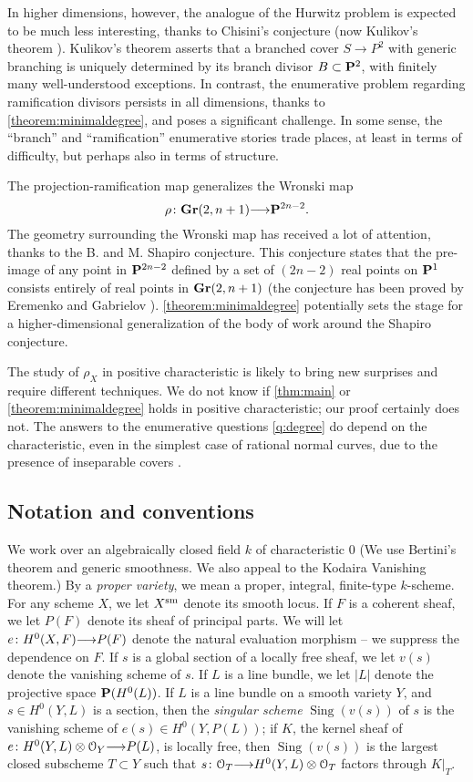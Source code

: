 \documentclass[11pt,reqno]{amsart}
\theoremstyle{plain}
\theoremstyle{definition}
\theoremstyle{remark}
\numberwithin{equation}{section}
\DeclareMathOperator{\sing}{Sing}
\newcommand{\cO}{{\mathcal O}}
\renewcommand{\to}{{\longrightarrow}}
\numberwithin{equation}{section}
\begin{document}
In higher dimensions, however, the analogue of the Hurwitz problem is expected to be much less interesting, thanks to Chisini's conjecture (now Kulikov's theorem \cite{1064-5632-63-6-A03}).
Kulikov's theorem asserts that a branched cover $S \to P^2$ with generic branching is uniquely determined by its branch divisor $B \subset \P^{2}$, with finitely many well-understood exceptions.
In contrast, the enumerative problem regarding ramification divisors persists in all dimensions, thanks to \autoref{theorem:minimaldegree}, and poses a significant challenge.
In some sense, the ``branch'' and ``ramification'' enumerative stories trade places, at least in terms of difficulty, but perhaps also in terms of structure.

The projection-ramification map generalizes the Wronski map
\[ \rho \from \Gr(2, n+1) \to \P^{2n-2}.\]
The geometry surrounding the Wronski map has received a lot of attention, thanks to the B. and M. Shapiro conjecture.
This conjecture states that the pre-image of any point in $\P^{2n-2}$ defined by a set of $(2n-2)$ real points on $\P^1$ consists entirely of real points in $\Gr(2, n+1)$ \cite{sottile2000} (the conjecture has been proved by Eremenko and Gabrielov \cite{Erem/Gabr1}).
\autoref{theorem:minimaldegree} potentially sets the stage for a higher-dimensional generalization of the body of work around the Shapiro conjecture.

The study of $\rho_X$ in positive characteristic is likely to bring new surprises and require different techniques.
We do not know if \autoref{thm:main} or \autoref{theorem:minimaldegree} holds in positive characteristic; our proof certainly does not.
The answers to the enumerative questions \autoref{q:degree} do depend on the characteristic, even in the simplest case of rational normal curves, due to the presence of inseparable covers \cite{MR2218904}.

\subsection{Notation and conventions} We work over an algebraically closed field
$k$ of characteristic $0$ (We use Bertini's theorem and generic smoothness. We
also appeal to the Kodaira Vanishing theorem.) By a {\sl proper variety}, we mean a proper, integral, finite-type $k$-scheme. For any scheme $X$, we let $X^{\rm sm}$ denote its smooth locus. If $F$ is a coherent sheaf, we let $P(F)$ denote its sheaf of principal parts. We will let $e\from H^{0}(X,F) \to P(F)$ denote the natural evaluation morphism -- we suppress the dependence on $F$. If $s$ is a global section of a locally free sheaf, we let $v(s)$ denote the vanishing scheme of $s$.  If $L$ is a line bundle, we let $|L|$ denote the projective space $\P(H^{0}(L))$.  If $L$ is a line bundle on a smooth variety $Y$, and $s \in H^{0}(Y,L)$ is a section, then the {\sl singular scheme} $\sing(v(s))$ of $s$ is the vanishing scheme of $e(s) \in H^{0}(Y,P(L))$; if $K$, the kernel sheaf of $e \from H^{0}(Y,L) \otimes \cO_{Y} \to P(L)$, is locally free, then $\sing(v(s))$ is the largest closed subscheme $T \subset Y$  such that $s\from \cO_{T} \to H^{0}(Y,L) \otimes \cO_{T}$ factors through $K|_{T}$.  
\end{document}
